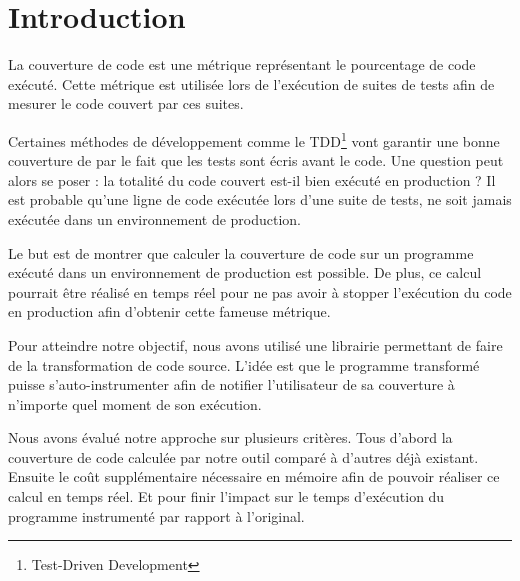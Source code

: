 \chapter*{Introduction}
	\thispagestyle{introduction}

La couverture de code est une métrique représentant le pourcentage de code exécuté. Cette métrique est utilisée lors de l'exécution de suites de tests afin de mesurer le code couvert par ces suites. 

Certaines méthodes de développement comme le TDD\footnote{Test-Driven Development} vont garantir une bonne couverture de par le fait que les tests sont écris avant le code. Une question peut alors se poser : la totalité du code couvert est-il bien exécuté en production ? Il est probable qu’une ligne de code exécutée lors d’une suite de tests, ne soit jamais exécutée dans un environnement de production. 

Le but est de montrer que calculer la couverture de code sur un programme exécuté dans un environnement de production est possible. De plus, ce calcul pourrait être réalisé en temps réel pour ne pas avoir à stopper l’exécution du code en production afin d’obtenir cette fameuse métrique.

Pour atteindre notre objectif, nous avons utilisé une librairie permettant de faire de la transformation de code source. L’idée est que le programme transformé puisse s’auto-instrumenter afin de notifier l’utilisateur de sa couverture à n'importe quel moment de son exécution.

Nous avons évalué notre approche sur plusieurs critères. Tous d’abord la couverture de code calculée par notre outil comparé à d’autres déjà existant. Ensuite le coût supplémentaire nécessaire en mémoire afin de pouvoir réaliser ce calcul en temps réel. Et pour finir l’impact sur le temps d’exécution du programme instrumenté par rapport à l’original.

